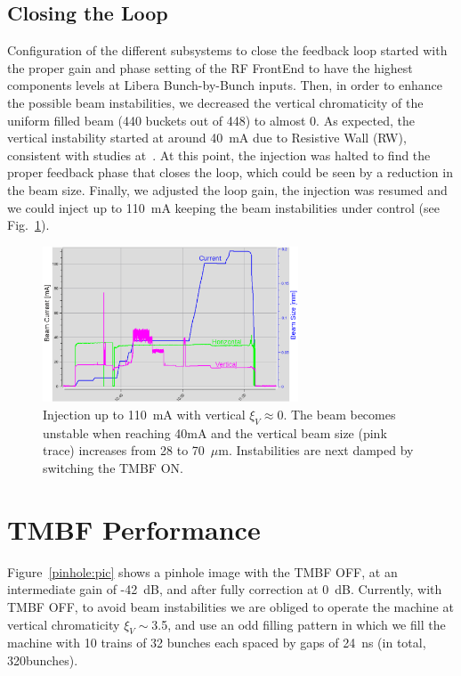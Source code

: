 \documentclass[a4paper,
              ]{jacow}
\begin{document}
\subsection{Closing the Loop}

Configuration of the different subsystems to close the feedback loop started with the proper gain and phase setting of the RF FrontEnd to have the highest components levels at Libera Bunch-by-Bunch inputs. Then, in order to enhance the possible beam instabilities, we decreased the vertical chromaticity of the uniform filled beam (440 buckets out of 448) to almost 0. As expected, the vertical instability started at around 40~mA due to Resistive Wall (RW), consistent with studies at~\cite{Thomas}. At this point, the injection was halted to find the proper feedback phase that closes the loop, which could be seen by a reduction in the beam size. Finally, we adjusted the loop gain, the injection was resumed and we could inject up to 110~mA keeping the beam instabilities under control (see Fig.~\ref{DCCT:sigmas}). 

\begin{figure}[hbt!]
   \centering
   \includegraphics[width=76mm]{img/TUPB046f5}
   \caption{Injection up to 110~mA with vertical $\xi_V \approx 0$. The beam becomes unstable when reaching 40mA and the vertical beam size (pink trace) increases from 28 to 70~$\mu$m. Instabilities are next damped by switching the TMBF ON.}
   \label{DCCT:sigmas}
\end{figure}

\section{TMBF Performance}

Figure~\ref{pinhole:pic} shows a pinhole image with the TMBF OFF, at an intermediate gain of -42~dB, and after fully correction at 0~dB. Currently, with TMBF OFF, to avoid beam instabilities we are obliged to operate the machine at vertical chromaticity $\xi_V\sim$3.5, and use an odd filling pattern in which we fill the machine with 10 trains of 32 bunches each spaced by gaps of 24~ns (in total, 320bunches). 
\end{document}
